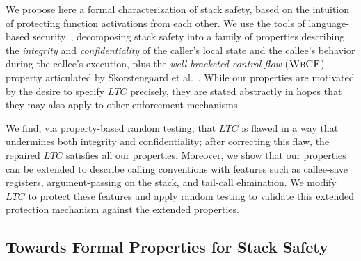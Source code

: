 \documentclass[10pt,conference]{ieeetran}%
\theoremstyle{definition}
\begin{document}
We propose here a formal characterization of stack safety, based on
the intuition of protecting function activations from each other.
We use the tools of language-based
security~\cite{sabelfeld2003language}, decomposing stack safety into a family of
properties describing
the {\em integrity} and {\em confidentiality} of the caller’s local state
and the callee's behavior during the callee's execution, plus the
{\em well-bracketed control flow} (\(\textnormal{\sc WbCF}\)) property articulated by
Skorstengaard et al.~\cite{SkorstengaardSTKJFP}.
While our properties are motivated by the desire to specify \(LTC\) precisely,
they are stated abstractly in hopes that they may also apply
to other enforcement mechanisms.

We find, via property-based random testing, that \(LTC\) is flawed in
a way that undermines both integrity and confidentiality; after
correcting this flaw, the repaired \(LTC\) satisfies all our
properties.  Moreover, we show that our properties can be extended to
describe calling conventions with features such as callee-save
registers, argument-passing on the stack, and tail-call
elimination. We modify \(LTC\) to protect these features and apply
random testing to validate this extended protection mechanism against
the extended properties.

\subsection {Towards Formal Properties for Stack Safety}


\end{document}
